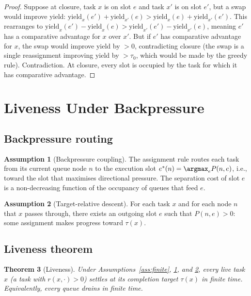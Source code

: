 \documentclass[11pt,twocolumn,a4paper]{article}
\theoremstyle{plain}
\newtheorem{theorem}{Theorem}[section]
\theoremstyle{definition}
\newtheorem{assumption}[theorem]{Assumption}
\theoremstyle{remark}
\newcommand{\tick}{\tau_0}
\newcommand{\yield}{\mathrm{yield}}
\newcommand{\pres}{P}
\begin{document}
\begin{proof}
Suppose at closure, task $x$ is on slot $e$ and task $x'$ is on slot $e'$, but a swap would improve yield: $\yield_x(e') + \yield_{x'}(e) > \yield_x(e) + \yield_{x'}(e')$. This rearranges to $\yield_x(e') - \yield_x(e) > \yield_{x'}(e') - \yield_{x'}(e)$, meaning $e'$ has a comparative advantage for $x$ over $x'$. But if $e'$ has comparative advantage for $x$, the swap would improve yield by $> 0$, contradicting closure (the swap is a single reassignment improving yield by $> \tick$, which would be made by the greedy rule). Contradiction. At closure, every slot is occupied by the task for which it has comparative advantage.
\end{proof}

\section{Liveness Under Backpressure}
\label{sec:liveness}

\subsection{Backpressure routing}

\begin{assumption}[Backpressure coupling]
\label{ass:backpressure}
The assignment rule routes each task from its current queue node $n$ to the execution slot $e^*(n) = \argmax_{e} \pres(n, e)$, i.e., toward the slot that maximises directional pressure. The separation cost of slot $e$ is a non-decreasing function of the occupancy of queues that feed $e$.
\end{assumption}

\begin{assumption}[Target-relative descent]
\label{ass:descent}
For each task $x$ and for each node $n$ that $x$ passes through, there exists an outgoing slot $e$ such that $\pres(n, e) > 0$: some assignment makes progress toward $\tau(x)$.
\end{assumption}

\subsection{Liveness theorem}

\begin{theorem}[Liveness]
\label{thm:liveness}
Under Assumptions~\ref{ass:finite}, \ref{ass:backpressure}, and \ref{ass:descent}, every live task $x$ (a task with $r(x, \cdot) > 0$) settles at its completion target $\tau(x)$ in finite time. Equivalently, every queue drains in finite time.
\end{theorem}
\end{document}
